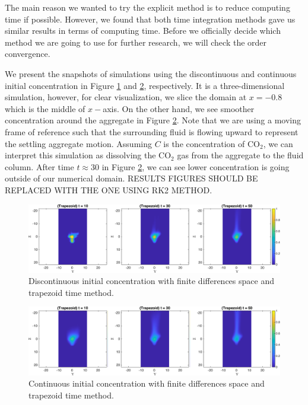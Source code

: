 The main reason we wanted to try the explicit method is to reduce computing time if possible. However, we found that both time integration methods gave us similar results in terms of computing time. Before we officially decide which method we are going to use for further research, we will check the order convergence.
\par
We present the snapshots of simulations using the discontinuous and continuous initial concentration in Figure \ref{fig_ic4_trap_snap} and \ref{fig_icG_trap_snap}, respectively. It is a three-dimensional simulation, however, for clear visualization, we slice the domain at $x= -0.8$ which is the middle of $x-$axis.
On the other hand, we see smoother concentration around the aggregate in Figure \ref{fig_icG_trap_snap}. Note that we are using a moving frame of reference such that the surrounding fluid is flowing upward to represent the settling aggregate motion. Assuming $C$ is the concentration of CO$_2$, we can interpret this simulation as dissolving the CO$_2$ gas from the aggregate to the fluid column. 
After time $t \approx 30$ in Figure \ref{fig_icG_trap_snap}, we can see lower concentration is going outside of our numerical domain.  
{\color{red} RESULTS FIGURES SHOULD BE REPLACED WITH THE ONE USING RK2 METHOD.}
 \begin{figure}[h]
 \begin{center}
	\includegraphics[scale=0.7]{./figures/fig_ic4_Trap_snap135}
 \end{center}
 \caption{Discontinuous initial concentration with finite differences space and trapezoid time method.}
 \label{fig_ic4_trap_snap}
 \end{figure}
 \begin{figure}[h]
 \begin{center}
	\includegraphics[scale=0.7]{./figures/fig_icG_Trap_snap135}
 \end{center}
 \caption{Continuous initial concentration with finite differences space and trapezoid time method.}
 \label{fig_icG_trap_snap}
 \end{figure}
